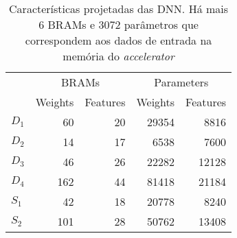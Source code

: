 \begin{table}[ht!]
\centering
\caption{Características projetadas das DNN. Há mais 6 BRAMs e 3072 parâmetros que correspondem aos dados de entrada na memória do \textit{accelerator}}
\label{tab:5-dnn-report}
\begin{tabular}{lrrrr}
\toprule
 & \multicolumn{2}{c}{BRAMs} & \multicolumn{2}{c}{Parameters} \\
\cmidrule(r){2-3} \cmidrule(l){5-6}
 & Weights & Features & Weights & Features \\
\midrule
$D_1$ & 60 & 20 & 29354 & 8816 \\
$D_2$ & 14 & 17 & 6538 & 7600 \\
$D_3$ & 46 & 26 & 22282 & 12128 \\
$D_4$ & 162 & 44 & 81418 & 21184 \\
$S_1$ & 42 & 18 & 20778 & 8240 \\
$S_2$ & 101 & 28 & 50762 & 13408 \\
\bottomrule
\end{tabular}
\end{table}